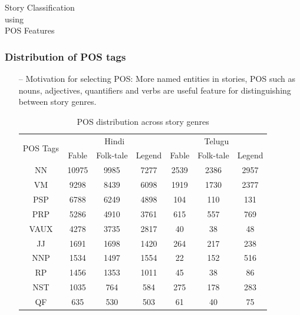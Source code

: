 \documentclass{beamer}
\begin{document}
\begin{frame}
\begin{center}
\Huge{Story Classification\\ using\\ POS Features}
\end{center}
\end{frame}

\begin{frame}
\frametitle{Distribution of POS tags}
\begin{itemize}
\item[--] Motivation for selecting POS: More named entities in stories, POS such as nouns, adjectives, quantifiers and verbs are useful feature for distinguishing between story genres.

\begin{table}[h]
\renewcommand{\arraystretch}{1}
\caption {POS distribution across story genres\label{POS Distribution}} 
\footnotesize\setlength{\tabcolsep}{6pt}
\centering
\begin{tabular}{|c|c|c|c||c|c|c|}
\hline
\multirow{2}{*}{POS Tags} & \multicolumn{3}{c||}{Hindi} & \multicolumn{3}{c|}{Telugu} \\ \cline{2-7} 
 & Fable & Folk-tale & Legend & Fable & Folk-tale & Legend \\ \hline
NN & 10975 & 9985 & 7277 & 2539 & 2386 & 2957 \\ \hline
VM & 9298 & 8439 & 6098 & 1919 & 1730 & 2377 \\ \hline
PSP & 6788 & 6249 & 4898 & 104 & 110 & 131 \\ \hline
PRP & 5286 & 4910 & 3761 & 615 & 557 & 769 \\ \hline
VAUX & 4278 & 3735 & 2817 & 40 & 38 & 48 \\ \hline
JJ & 1691 & 1698 & 1420 & 264 & 217 & 238 \\ \hline
NNP & 1534 & 1497 & 1554 & 22 & 152 & 516 \\ \hline
RP & 1456 & 1353 & 1011 & 45 & 38 & 86 \\ \hline
NST & 1035 & 764 & 584 & 275 & 178 & 283 \\ \hline
QF & 635 & 530 & 503 & 61 & 40 & 75 \\ \hline
\end{tabular}
\end{table}

\end{itemize}
\end{frame}
\end{document}
